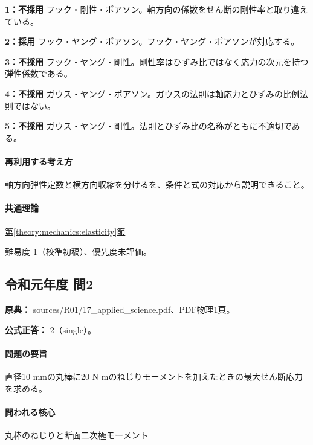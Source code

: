 \noindent\textbf{1：不採用} フック・剛性・ポアソン。軸方向の係数をせん断の剛性率と取り違えている。\par

\noindent\textbf{2：採用} フック・ヤング・ポアソン。フック・ヤング・ポアソンが対応する。\par

\noindent\textbf{3：不採用} フック・ヤング・剛性。剛性率はひずみ比ではなく応力の次元を持つ弾性係数である。\par

\noindent\textbf{4：不採用} ガウス・ヤング・ポアソン。ガウスの法則は軸応力とひずみの比例法則ではない。\par

\noindent\textbf{5：不採用} ガウス・ヤング・剛性。法則とひずみ比の名称がともに不適切である。\par

\paragraph{再利用する考え方} 軸方向弾性定数と横方向収縮を分けるを、条件と式の対応から説明できること。

\paragraph{共通理論} \hyperref[theory:mechanics:elasticity]{第\ref*{theory:mechanics:elasticity}節}

\par 難易度 1（校準初稿）、優先度未評価。

\subsection{令和元年度 問2}
\label{q:r01-reg-applied-02}

\noindent\textbf{原典：} sources/R01/17\_applied\_science.pdf、PDF物理1頁。

\textbf{公式正答：} 2（single）。

\paragraph{問題の要旨} 直径10 mmの丸棒に20 N mのねじりモーメントを加えたときの最大せん断応力を求める。

\paragraph{問われる核心} 丸棒のねじりと断面二次極モーメント

